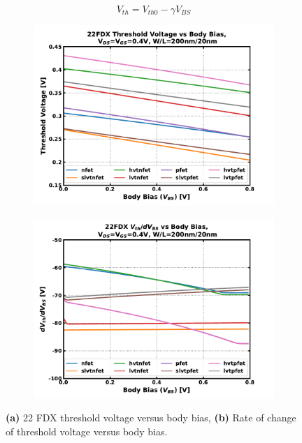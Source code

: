 		\begin{equation}
		V_{th} = V_{th0} - \gamma V_{BS}
		\end{equation}

		\begin{figure}[htb!]
		    \centering
		    \begin{subfigure}{0.5\textwidth}
		        \centering
		        \includegraphics[width=1\textwidth, angle=0]{./figs/design/vth_vbs}
		        \caption{ }
		        \label{fig:vth_vs_vbs}
		    \end{subfigure}%
		    \begin{subfigure}{0.5\textwidth}
		        \centering
		        \includegraphics[width=1\textwidth, angle=0]{./figs/design/vth_slope_vbs}
		        \caption{ }
		        \label{fig:vth_slope_vs_vbs}
		    \end{subfigure}
		    \caption{\textbf{(a)} 22 FDX threshold voltage versus body bias, \textbf{(b)} Rate of change of threshold voltage versus body bias.}
		    \label{fig:vth_groupa}
		\end{figure} 


